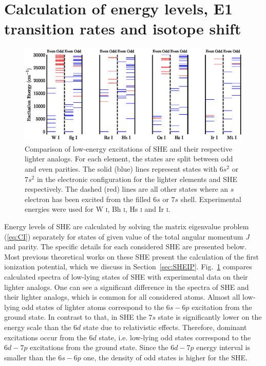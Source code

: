 \documentclass[10pt,a4paper, twoside]{report}
\begin{document}
\section{Calculation of energy levels, E1 transition rates and isotope shift} \label{sec:spectra}
\begin{landscape}
\begin{figure}
\centering
\includegraphics[scale=1]{./figures/Sg_Mt_Energy_Plot.eps} 
\caption[Low-energy excitation comparison between SHE and each respective lighter analog.]{Comparison of low-energy excitations of SHE and their respective lighter analogs. For each element, the states are split between odd and even parities. The solid (blue) lines represent states with $6s^2$ or $7s^2$ in the electronic configuration for the lighter elements and SHE respectively. The dashed (red) lines are all other states where an $s$ electron has been excited from the filled $6s$ or $7s$ shell. Experimental energies were used for W \textsc{i}, Bh \textsc{i}, Hs \textsc{i} and Ir \textsc{i}. \cite{NIST_ASD}\label{fig:EL}}
\end{figure}
\end{landscape}
Energy levels of SHE are calculated by solving the matrix eigenvalue problem (\ref{eq:CI}) separately for states of given value of the total angular momentum $J$ and parity. The specific details for each considered SHE are presented below. Most previous theoretical works on these SHE present the calculation of the first ionization potential, which we discuss in Section~\ref{sec:SHEIP}. Fig.~\ref{fig:EL} compares calculated spectra of low-lying states of SHE with experimental data on their lighter analogs. One can see a significant difference in the spectra of SHE and their lighter analogs, which is common for all considered atoms. Almost all low-lying odd states of lighter atoms correspond to the $6s-6p$ excitation from the ground state. In contrast to that, in SHE the $7s$ state is significantly lower on the energy scale than the $6d$ state due to relativistic effects. Therefore, dominant excitations occur from the $6d$ state, i.e. low-lying odd states correspond to the $6d-7p$ excitations from the ground state. Since the $6d-7p$ energy interval is smaller than the $6s-6p$ one, the density of odd states is higher for the SHE. 
\end{document}
